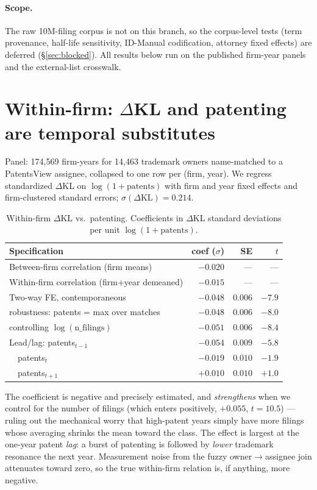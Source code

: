\documentclass[11pt]{article}
\newcommand{\dkl}{$\Delta$KL}
\begin{document}
\paragraph{Scope.} The raw 10M-filing corpus is not on this branch, so the
corpus-level tests (term provenance, half-life sensitivity, ID-Manual
codification, attorney fixed effects) are deferred (\S\ref{sec:blocked}). All
results below run on the published firm-year panels and the external-list
crosswalk.

\section{Within-firm: \dkl{} and patenting are temporal substitutes}
Panel: 174{,}569 firm-years for 14{,}463 trademark owners name-matched to a
PatentsView assignee, collapsed to one row per (firm, year). We regress
standardized \dkl{} on $\log(1+\text{patents})$ with firm and year fixed effects
and firm-clustered standard errors; $\sigma(\Delta\mathrm{KL})=0.214$.

\begin{table}[h]\centering\small
\caption{Within-firm \dkl{} vs.\ patenting. Coefficients in \dkl{} standard
deviations per unit $\log(1+\text{patents})$.}
\begin{tabular}{lrrr}
\toprule
Specification & coef ($\sigma$) & SE & $t$ \\
\midrule
Between-firm correlation (firm means) & $-0.020$ & --- & --- \\
Within-firm correlation (firm+year demeaned) & $-0.015$ & --- & --- \\
Two-way FE, contemporaneous & $-0.048$ & $0.006$ & $-7.9$ \\
\quad robustness: patents = max over matches & $-0.048$ & $0.006$ & $-8.0$ \\
\quad controlling $\log(\text{n\_filings})$ & $-0.051$ & $0.006$ & $-8.4$ \\
Lead/lag: patents$_{t-1}$ & $-0.054$ & $0.009$ & $-5.8$ \\
\quad\quad\quad\ \ patents$_{t}$ & $-0.019$ & $0.010$ & $-1.9$ \\
\quad\quad\quad\ \ patents$_{t+1}$ & $+0.010$ & $0.010$ & $+1.0$ \\
\bottomrule
\end{tabular}
\end{table}

The coefficient is negative and precisely estimated, and \emph{strengthens} when
we control for the number of filings (which enters positively, $+0.055$,
$t=10.5$) --- ruling out the mechanical worry that high-patent years simply have
more filings whose averaging shrinks the mean toward the class. The effect is
largest at the one-year patent \emph{lag}: a burst of patenting is followed by
\emph{lower} trademark resonance the next year. Measurement noise from the fuzzy
owner$\to$assignee join attenuates toward zero, so the true within-firm relation
is, if anything, more negative.
\end{document}
